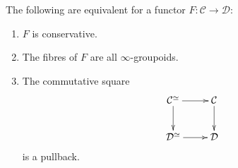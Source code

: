\begin{exercise}
\label{exercise-equivalences-for-conservative-functor}
The following are equivalent for a functor $F:\mathcal{C} \to \mathcal{D}$:
\begin{enumerate}
\item $F$ is conservative.
\label{item-conservative1}

\item The fibres of $F$ are all $\infty$-groupoids.
\label{item-conservative2}

\item The commutative square
\label{item-conservative3}
$$
\xymatrix{
\mathcal{C}^{\simeq}\ar[r]\ar[d]&\mathcal{C}\ar[d]\\
\mathcal{D}^{\simeq}\ar[r]&\mathcal{D}
}
$$
is a pullback.
\end{enumerate}
\end{exercise}

